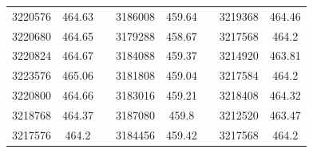 \documentclass[12pt]{mwart}
\begin{document}
\begin{table}[H]
\begin{tabular}{cclcclcc}
		3220576                                                  & 464.63                                                        &  & 3186008                                                  & 459.64                                                        &  & 3219368                                                  & 464.46                                                        \\
		3220680                                                  & 464.65                                                        &  & 3179288                                                  & 458.67                                                        &  & 3217568                                                  & 464.2                                                         \\
		3220824                                                  & 464.67                                                        &  & 3184088                                                  & 459.37                                                        &  & 3214920                                                  & 463.81                                                        \\
		3223576                                                  & 465.06                                                        &  & 3181808                                                  & 459.04                                                        &  & 3217584                                                  & 464.2                                                         \\
		3220800                                                  & 464.66                                                        &  & 3183016                                                  & 459.21                                                        &  & 3218408                                                  & 464.32                                                        \\
		3218768                                                  & 464.37                                                        &  & 3187080                                                  & 459.8                                                         &  & 3212520                                                  & 463.47                                                        \\
		3217576                                                  & 464.2                                                         &  & 3184456                                                  & 459.42                                                        &  & 3217568                                                  & 464.2                                                         \\

\end{tabular}
\end{table}
\end{document}
